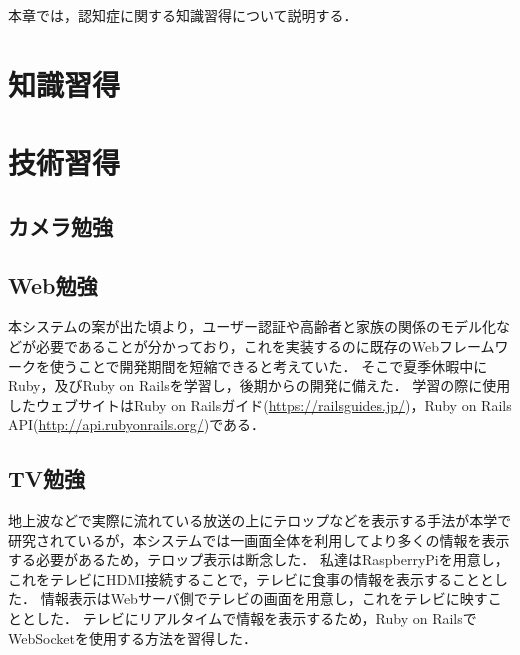 \documentclass[../report]{subfiles}
\begin{document}
本章では，認知症に関する知識習得について説明する．


\section{知識習得}


\section{技術習得}
\subsection{カメラ勉強}

\subsection{Web勉強}
本システムの案が出た頃より，ユーザー認証や高齢者と家族の関係のモデル化などが必要であることが分かっており，これを実装するのに既存のWebフレームワークを使うことで開発期間を短縮できると考えていた．
そこで夏季休暇中にRuby，及びRuby on Railsを学習し，後期からの開発に備えた．
学習の際に使用したウェブサイトはRuby on Railsガイド(\url{https://railsguides.jp/})，Ruby on Rails API(\url{http://api.rubyonrails.org/})である．

\subsection{TV勉強}
地上波などで実際に流れている放送の上にテロップなどを表示する手法が本学で研究されているが，本システムでは一画面全体を利用してより多くの情報を表示する必要があるため，テロップ表示は断念した．
私達はRaspberryPiを用意し，これをテレビにHDMI接続することで，テレビに食事の情報を表示することとした．
情報表示はWebサーバ側でテレビの画面を用意し，これをテレビに映すこととした．
テレビにリアルタイムで情報を表示するため，Ruby on RailsでWebSocketを使用する方法を習得した．
\end{document}
